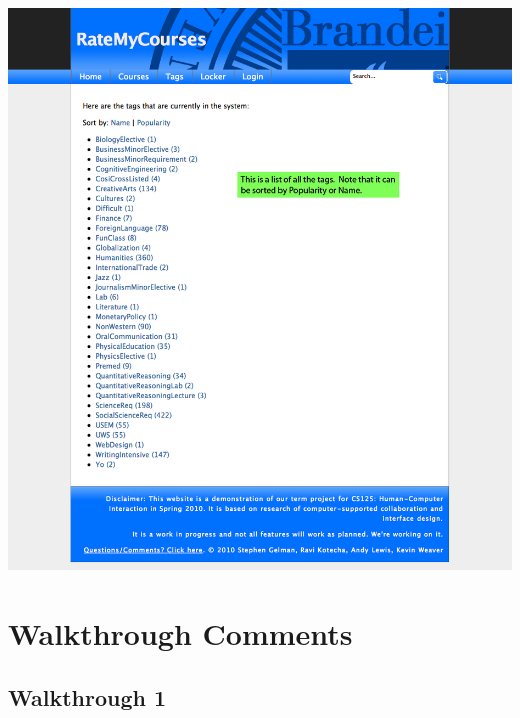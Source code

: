 \documentclass[12pt]{report}
\begin{document}
\includegraphics[width=\textwidth]{screen-7.png}

\section{Walkthrough Comments}

\subsection{Walkthrough 1}
\end{document}
